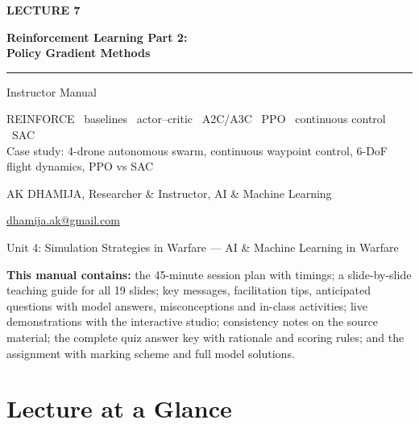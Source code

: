 \documentclass[11pt]{article}
\begin{document}
\begin{titlepage}\centering\vspace*{2.2cm}
{\color{AccN}\large\bfseries LECTURE 7\par}\vspace{0.6cm}
{\color{NavyN}\Huge\bfseries Reinforcement Learning Part 2:\\Policy Gradient Methods\par}\vspace{0.6cm}
{\color{AccN}\rule{0.7\textwidth}{1.5pt}}\par\vspace{0.6cm}
{\LARGE Instructor Manual\par}\vspace{0.4cm}
{\large\begin{minipage}{0.85\textwidth}\centering REINFORCE \textbullet\ baselines \textbullet\ actor--critic \textbullet\ A2C/A3C \textbullet\ PPO \textbullet\ continuous control \textbullet\ SAC\\Case study: 4-drone autonomous swarm, continuous waypoint control, 6-DoF flight dynamics, PPO vs SAC\end{minipage}\par}\vspace{2cm}
{\large AK DHAMIJA, Researcher \& Instructor, AI \& Machine Learning\par}\vspace{0.2cm}
{\normalsize \href{mailto:dhamija.ak@gmail.com}{dhamija.ak@gmail.com} \quad\textbullet{}\par}\vspace{0.3cm}
{Unit 4: Simulation Strategies in Warfare --- AI \& Machine Learning in Warfare\par}\vfill
\begin{tcolorbox}[colback=NavyN!4,colframe=NavyN,boxrule=0.6pt,arc=2pt,width=0.9\textwidth]\small
\textbf{This manual contains:} the 45-minute session plan with timings; a slide-by-slide teaching guide for all 19 slides; key messages, facilitation tips, anticipated questions with model answers, misconceptions and in-class activities; live demonstrations with the interactive studio; consistency notes on the source material; the complete quiz answer key with rationale and scoring rules; and the assignment with marking scheme and full model solutions.
\end{tcolorbox}
\end{titlepage}
\tableofcontents\newpage


\section{Lecture at a Glance}
\end{document}
